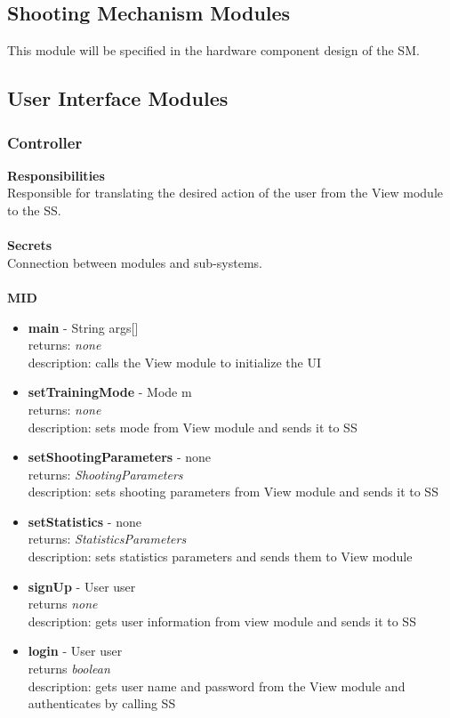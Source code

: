 \documentclass[11pt]{article}
\begin{document}
\subsection{Shooting Mechanism Modules}
This module will be specified in the hardware component design of the SM.
\subsection{User Interface Modules}
\subsubsection*{Controller}
\textbf{Responsibilities} \\
Responsible for translating the desired action of the user from the View module to the SS. \\ \\
\textbf{Secrets} \\
Connection between modules and sub-systems. \\ \\
\textbf{MID}
\begin{itemize}
\item \textbf{main} - String args[] \\ returns: \textit{none} \\ description: calls the View module to initialize the UI
\item \textbf{setTrainingMode} - Mode m \\ returns: \textit{none} \\ description: sets mode from View module and sends it to SS
\item \textbf{setShootingParameters} - none \\ returns: \textit{ShootingParameters} \\ description: sets shooting parameters from View module and sends it to SS
\item \textbf{setStatistics} - none \\ returns: \textit{StatisticsParameters} \\ description: sets statistics parameters and sends them to View module
\item \textbf{signUp} - User user \\ returns \textit{none} \\ description: gets user information from view module and sends it to SS
\item \textbf{login} - User user \\ returns \textit{boolean} \\ description: gets user name and password from the View module and authenticates by calling SS
\end{itemize}
\end{document}

